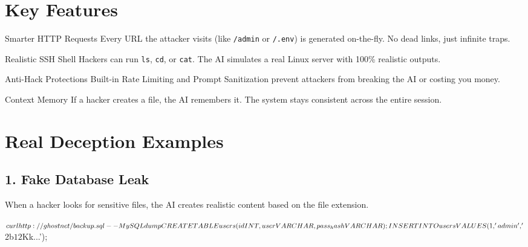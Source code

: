 \documentclass[11pt,a4paper,oneside]{article}
\begin{document}
\section{Key Features}
\begin{tcbraster}[raster columns=2, raster gutter=4mm]
    \begin{featurebox}{\faGlobe \hspace{1mm} Smarter HTTP Requests}
        Every URL the attacker visits (like \texttt{/admin} or \texttt{/.env}) is generated on-the-fly. No dead links, just infinite traps.
    \end{featurebox}
    \begin{featurebox}{\faTerminal \hspace{1mm} Realistic SSH Shell}
        Hackers can run \texttt{ls}, \texttt{cd}, or \texttt{cat}. The AI simulates a real Linux server with 100\% realistic outputs.
    \end{featurebox}
    \begin{featurebox}{\faLock \hspace{1mm} Anti-Hack Protections}
        Built-in Rate Limiting and Prompt Sanitization prevent attackers from breaking the AI or costing you money.
    \end{featurebox}
    \begin{featurebox}{\faHistory \hspace{1mm} Context Memory}
        If a hacker creates a file, the AI remembers it. The system stays consistent across the entire session.
    \end{featurebox}
\end{tcbraster}

\vspace{0.5cm}

\section{Real Deception Examples}

\subsection{1. Fake Database Leak}
When a hacker looks for sensitive files, the AI creates realistic content based on the file extension.

\begin{terminalbox}
$ curl http://ghostnet/backup.sql \\
-- MySQL dump \\
CREATE TABLE users (id INT, user VARCHAR, pass_hash VARCHAR); \\
INSERT INTO users VALUES (1, 'admin', '$2b$12$Kk...');
\end{terminalbox}
\end{document}
